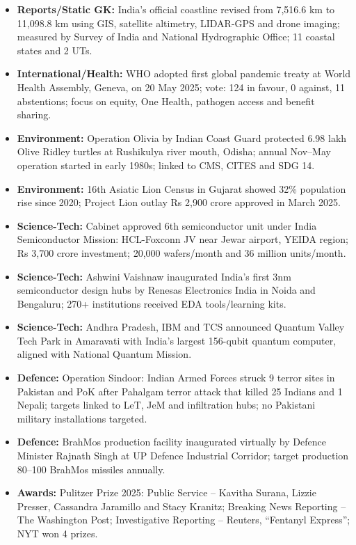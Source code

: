 \documentclass[10pt,a4paper]{article}
\begin{document}
\begin{itemize}
    \item \textbf{Reports/Static GK:} India's official coastline revised from 7,516.6 km to 11,098.8 km using GIS, satellite altimetry, LIDAR-GPS and drone imaging; measured by Survey of India and National Hydrographic Office; 11 coastal states and 2 UTs.
    \item \textbf{International/Health:} WHO adopted first global pandemic treaty at World Health Assembly, Geneva, on 20 May 2025; vote: 124 in favour, 0 against, 11 abstentions; focus on equity, One Health, pathogen access and benefit sharing.
    \item \textbf{Environment:} Operation Olivia by Indian Coast Guard protected 6.98 lakh Olive Ridley turtles at Rushikulya river mouth, Odisha; annual Nov--May operation started in early 1980s; linked to CMS, CITES and SDG 14.
    \item \textbf{Environment:} 16th Asiatic Lion Census in Gujarat showed 32\% population rise since 2020; Project Lion outlay Rs 2,900 crore approved in March 2025.
    \item \textbf{Science-Tech:} Cabinet approved 6th semiconductor unit under India Semiconductor Mission: HCL-Foxconn JV near Jewar airport, YEIDA region; Rs 3,700 crore investment; 20,000 wafers/month and 36 million units/month.
    \item \textbf{Science-Tech:} Ashwini Vaishnaw inaugurated India's first 3nm semiconductor design hubs by Renesas Electronics India in Noida and Bengaluru; 270+ institutions received EDA tools/learning kits.
    \item \textbf{Science-Tech:} Andhra Pradesh, IBM and TCS announced Quantum Valley Tech Park in Amaravati with India's largest 156-qubit quantum computer, aligned with National Quantum Mission.
    \item \textbf{Defence:} Operation Sindoor: Indian Armed Forces struck 9 terror sites in Pakistan and PoK after Pahalgam terror attack that killed 25 Indians and 1 Nepali; targets linked to LeT, JeM and infiltration hubs; no Pakistani military installations targeted.
    \item \textbf{Defence:} BrahMos production facility inaugurated virtually by Defence Minister Rajnath Singh at UP Defence Industrial Corridor; target production 80--100 BrahMos missiles annually.
    \item \textbf{Awards:} Pulitzer Prize 2025: Public Service -- Kavitha Surana, Lizzie Presser, Cassandra Jaramillo and Stacy Kranitz; Breaking News Reporting -- The Washington Post; Investigative Reporting -- Reuters, ``Fentanyl Express''; NYT won 4 prizes.

\end{itemize}
\end{document}
